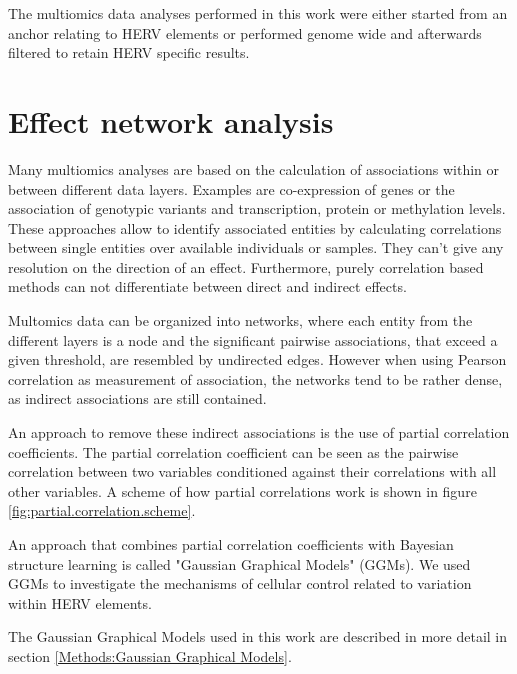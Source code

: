 \documentclass[a4paper,12pt,twoside,openright]{report}
\begin{document}

The multiomics data analyses performed in this work were either started from an anchor relating to HERV elements or performed genome wide and afterwards filtered to retain HERV specific results. 

\section{Effect network analysis}
\label{Introduction:Effect network analysis}
Many multiomics analyses are based on the calculation of associations within or between different data layers. Examples are co-expression of genes or the association of genotypic variants and transcription,  protein or methylation levels. These approaches allow to identify associated entities by calculating correlations between single entities over available individuals or samples. They can't give any resolution on the direction of an effect. Furthermore, purely correlation based methods can not differentiate between direct and indirect effects\cite{Hasin2017}.

Multomics data can be organized into networks, where each entity from the different layers is a node and the significant pairwise associations, that exceed a given threshold,  are resembled by undirected edges. However when using Pearson correlation as measurement of association, the networks tend to be rather dense, as indirect associations are still contained\cite{Krumsiek2011}. 

An approach to remove these indirect associations is the use of partial correlation coefficients. The partial correlation coefficient can be seen as the pairwise correlation between two variables conditioned against their correlations with all other variables. A scheme of how partial correlations work is shown in figure \ref{fig:partial.correlation.scheme}.

An approach that combines partial correlation coefficients with Bayesian structure learning is called "Gaussian Graphical Models"\cite{Krumsiek2011} (GGMs). We used GGMs to investigate the mechanisms of cellular control related to variation within HERV elements.

The Gaussian Graphical Models used in this work are described in more detail in section \ref{Methods:Gaussian Graphical Models}.
\end{document}
